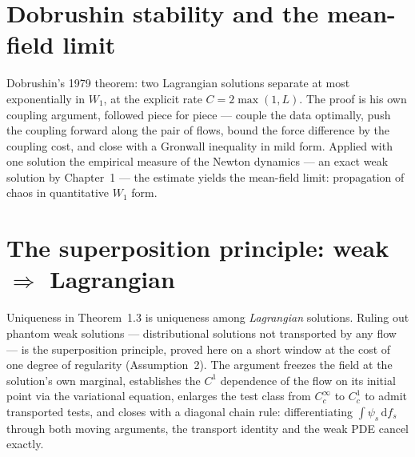 
\chapter{Dobrushin stability and the mean-field limit}

Dobrushin's 1979 theorem: two Lagrangian solutions separate at most exponentially in
$W_1$, at the explicit rate $C = 2\max(1,L)$. The proof is his own coupling argument,
followed piece for piece --- couple the data optimally, push the coupling forward along the
pair of flows, bound the force difference by the coupling cost, and close with a Gronwall
inequality in mild form. Applied with one solution the empirical measure of the Newton
dynamics --- an exact weak solution by Chapter~1 --- the estimate yields the mean-field
limit: propagation of chaos in quantitative $W_1$ form.


\chapter[The superposition principle: weak implies Lagrangian]{The superposition principle: weak $\Rightarrow$ Lagrangian}

Uniqueness in Theorem~1.3 is uniqueness among \emph{Lagrangian} solutions. Ruling out
phantom weak solutions --- distributional solutions not transported by any flow --- is the
superposition principle, proved here on a short window at the cost of one degree of
regularity (Assumption~2). The argument freezes the field at the solution's own marginal,
establishes the $C^1$ dependence of the flow on its initial point via the variational
equation, enlarges the test class from $C^\infty_c$ to $C^1_c$ to admit transported tests,
and closes with a diagonal chain rule: differentiating $\int \psi_s\,\mathrm{d}f_s$ through
both moving arguments, the transport identity and the weak PDE cancel exactly.

